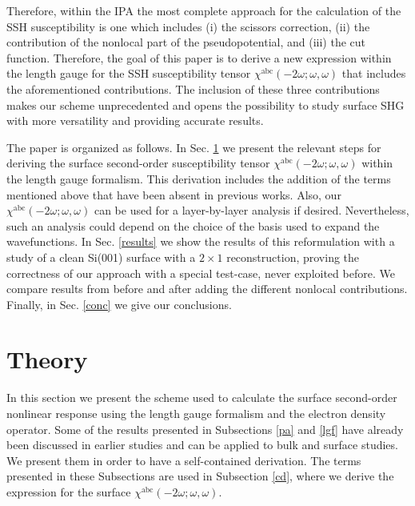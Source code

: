 \documentclass[floatfix,prb,aps,superscriptaddress,showpacs,11pt,preprint,letterpaper]{revtex4}
\begin{document}
Therefore, within the IPA the most complete approach for the calculation of 
the SSH susceptibility is one which includes (i) the scissors correction, 
(ii) the contribution of the nonlocal part of the 
pseudopotential, and
(iii) the cut function.
 Therefore, the goal of this paper is to derive a new 
expression within the length gauge for the SSH susceptibility tensor 
$\chi^{\mathrm{a}\mathrm{b}\mathrm{c}}(-2\omega;\omega,\omega)$ 
that includes the aforementioned contributions. The inclusion of these three 
contributions makes our scheme unprecedented and opens the possibility to 
study surface SHG with more versatility and providing accurate results. 

The paper is organized as follows. In Sec. \ref{theory} we present the 
relevant steps for deriving the surface second-order susceptibility tensor
$\chi^{\mathrm{a}\mathrm{b}\mathrm{c}}(-2\omega;\omega,\omega)$ within the 
length gauge formalism. This derivation includes the addition of the terms 
mentioned above that have been absent in previous works. Also, our 
$\chi^{\mathrm{a}\mathrm{b}\mathrm{c}}(-2\omega;\omega,\omega)$ can be used 
for a layer-by-layer analysis if desired. 
Nevertheless, such an analysis could depend on the choice of the basis
used to expand the wavefunctions.
In Sec. \ref{results} we show the 
results of this reformulation with a study of a clean Si(001) surface with a 
$2 \times 1$ reconstruction, 
proving the correctness of our approach with a special test-case,
never exploited before.
We compare results from before and after adding 
the different nonlocal contributions. Finally, in Sec. \ref{conc} we give 
our conclusions.

\section{Theory}

\label{theory}

In this section we present the scheme used to calculate the surface 
second-order nonlinear response using the length gauge formalism and
the electron 
density operator. 
Some of the results presented  in Subsections \ref{pa} and \ref{lgf}
have already been discussed in earlier
studies and can be applied to bulk and surface studies.\cite{sipePRB00,cabellosPRB09}
We present them in order to have a self-contained derivation.
The terms presented in these Subsections are used in Subsection \ref{cd}, 
where we derive the expression 
for the surface $\chi^{\mathrm{a}\mathrm{b}\mathrm{c}}(-2\omega;\omega,\omega)$.    
\end{document}
